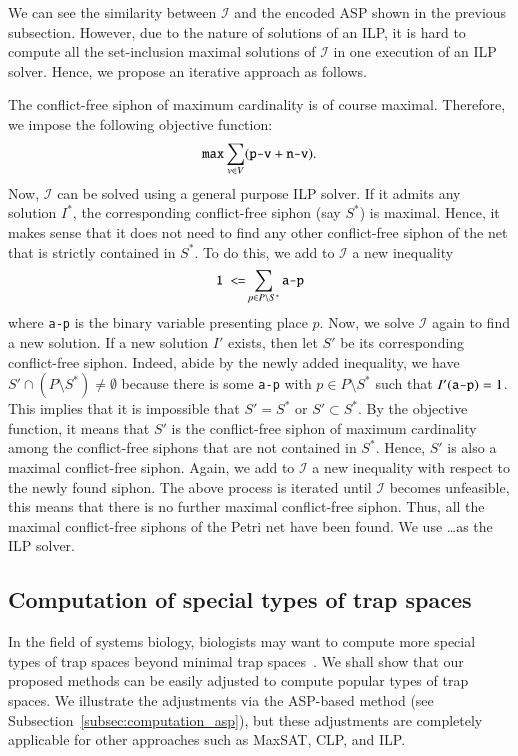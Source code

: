 \documentclass[preprint,12pt]{elsarticle}
\begin{document}
We can see the similarity between \(\mathcal{I}\) and the encoded ASP shown in the previous subsection.
However, due to the nature of solutions of an ILP, it is hard to compute all the set-inclusion maximal solutions of \(\mathcal{I}\) in one execution of an ILP solver.
Hence, we propose an iterative approach as follows.

The conflict-free siphon of maximum cardinality is of course maximal.
Therefore, we impose the following objective function:
\[
  \verb|max| \sum_{v \in V}(\verb|p-v| + \verb|n-v|).
\]
Now, \(\mathcal{I}\) can be solved using a general purpose ILP solver.
If it admits any solution \(I^{*}\), the corresponding conflict-free siphon (say \(S^{*}\)) is maximal.
Hence, it makes sense that it does not need to find any other conflict-free siphon of the net that is strictly contained in \(S^{*}\).
To do this, we add to \(\mathcal{I}\) a new inequality
\[
  \verb|1 <=| \sum_{p \in P \setminus S^{*}} \verb|a-p|
\]
where \verb|a-p| is the binary variable presenting place \(p\).
Now, we solve \(\mathcal{I}\) again to find a new solution.
If a new solution \(I'\) exists, then let \(S'\) be its corresponding conflict-free siphon.
Indeed, abide by the newly added inequality, we have \(S' \cap (P \setminus S^{*}) \neq \emptyset\) because there is some \verb|a-p| with \(p \in P \setminus S^{*}\) such that \(I'(\verb|a-p|) = 1\).
This implies that it is impossible that \(S' = S^{*}\) or \(S' \subset S^{*}\).
By the objective function, it means that \(S'\) is the conflict-free siphon of maximum cardinality among the conflict-free siphons that are not contained in \(S^{*}\).
Hence, \(S'\) is also a maximal conflict-free siphon.
Again, we add to \(\mathcal{I}\) a new inequality with respect to the newly found siphon.
The above process is iterated until \(\mathcal{I}\) becomes unfeasible, this means that there is no further maximal conflict-free siphon.
Thus, all the maximal conflict-free siphons of the Petri net have been found.
We use \dots as the ILP solver.

\subsection{Computation of special types of trap spaces}
\label{subsec:computation_special_ts}

In the field of systems biology, biologists may want to compute more special types of trap spaces beyond minimal trap spaces~\cite{klarner2017pyboolnet}.
We shall show that our proposed methods can be easily adjusted to compute popular types of trap spaces.
We illustrate the adjustments via the ASP-based method (see Subsection~\ref{subsec:computation_asp}), but these adjustments are completely applicable for other approaches such as MaxSAT, CLP, and ILP.
\end{document}
